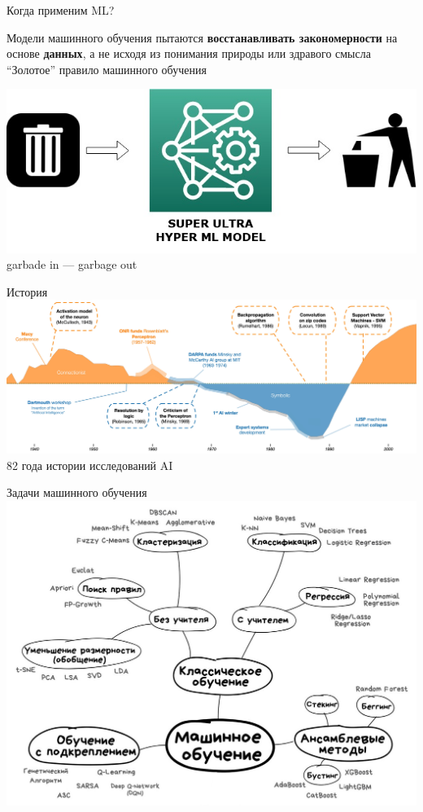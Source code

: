 \documentclass[aspectratio=169, professionalfonts]{beamer}
\begin{document}
\begin{frame}{Когда применим ML?}
    \begin{outline}
        \1 Модели машинного обучения пытаются \textbf{восстанавливать закономерности} на
        основе \textbf{данных}, а не исходя из понимания природы или здравого смысла
        \1 ``Золотое'' правило машинного обучения
    \end{outline}
    \begin{center}
        \includegraphics[width=.49\linewidth]{graphs/fig2.jpg} \\
        garbade in --- garbage out
    \end{center}
\end{frame}

\begin{frame}{История}
    \centering
    \includegraphics[width=\linewidth]{graphs/fig3.jpg} \\
    82 года истории исследований AI
\end{frame}

\begin{frame}{Задачи машинного обучения}
    \centering
    \includegraphics[width=.65\linewidth]{graphs/fig4.jpg}
\end{frame}
\end{document}
